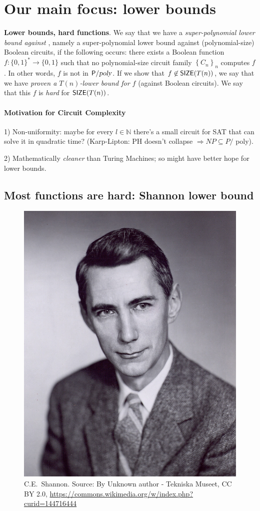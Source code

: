\section{Our main focus: lower bounds}

\begin{svgraybox}
\textbf{Lower bounds, hard functions}.
We say that we have a \textit{super-polynomial lower bound against \Ppoly}, namely a super-polynomial lower bound against (polynomial-size) Boolean circuits, if the following occurs: there exists a Boolean function $f:\{0,1\}^*\to \{0,1\}$ such that no polynomial-size circuit family $\left\{C_n\right\}_n$ computes $f$. In other words, $f$ is not in ${\mathsf{P}}/{\textsl{poly}}$. If we show that $f\not\in\operatorname{{\mathsf{SIZE}}}(T(n))$, we say that we have \textit{proven a $T(n)$-lower bound for $f$} (against Boolean circuits). We say that this $f$ is \emph{hard} for $\operatorname{{\mathsf{SIZE}}}(T(n))$.
\end{svgraybox}



\paragraph{Motivation for Circuit Complexity}

1)  Non-uniformity: maybe for every $l \in \mathbb{N}$ there's a small circuit for SAT that can solve it in quadratic time?
(Karp-Lipton: PH doesn't collapse $\Rightarrow N P \subseteq P /$ poly).

2) Mathematically \textit{cleaner} than Turing Machines; so might have better hope for lower bounds.


\subsection{Most functions are hard: Shannon lower bound}

\begin{figure}
    \centering
    \includegraphics[width=0.25\linewidth]{images/Shannon.jpg}
    \caption{C.E.~Shannon. Source: By Unknown author - Tekniska Museet, CC BY 2.0, \url{https://commons.wikimedia.org/w/index.php?curid=144716444}}
    \label{Claude Shannon}
\end{figure}






